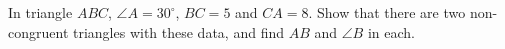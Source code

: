In triangle $ABC$, $\angle A=30^\circ$, $BC=5$ and $CA=8$. Show that there are two non-congruent triangles with these data, and find $AB$ and $\angle B$ in each.
